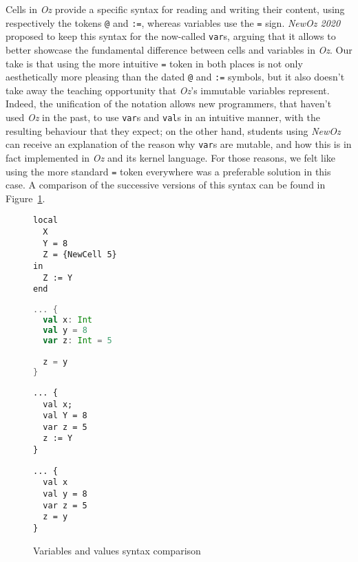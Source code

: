 Cells in \textit{Oz} provide a specific syntax for reading and writing their content, using respectively the tokens \texttt{@} and \texttt{:=}, whereas variables use the \texttt{=} sign.
\textit{NewOz 2020} proposed to keep this syntax for the now-called \texttt{var}s, arguing that it allows to better showcase the fundamental difference between cells and variables in \textit{Oz}.
Our take is that using the more intuitive \texttt{=} token in both places is not only aesthetically more pleasing than the dated \texttt{@} and \texttt{:=} symbols, but it also doesn't take away the teaching opportunity that \textit{Oz}'s immutable variables represent.
Indeed, the unification of the notation allows new programmers, that haven't used \textit{Oz} in the past, to use \texttt{var}s and \texttt{val}s in an intuitive manner, with the resulting behaviour that they expect;
on the other hand, students using \textit{NewOz} can receive an explanation of the reason why \texttt{var}s are mutable, and how this is in fact implemented in \textit{Oz} and its kernel language.
For those reasons, we felt like using the more standard \texttt{=} token everywhere was a preferable solution in this case.\newline
A comparison of the successive versions of this syntax can be found in Figure~\ref{fig:code-comp-var}.
\begin{figure}
    \noindent\begin{minipage}{.49\textwidth}
    \begin{lstlisting}[title={Oz},language=oz]
local
  X
  Y = 8
  Z = {NewCell 5}
in
  Z := Y
end
    \end{lstlisting}
\end{minipage}
\hfill
    \noindent\begin{minipage}{.49\textwidth}
    \begin{lstlisting}[title={Scala/Ozma},language=scala]
... {
  val x: Int
  val y = 8
  var z: Int = 5

  z = y
}
    \end{lstlisting}
\end{minipage}
    \noindent\begin{minipage}{.49\textwidth}
    \begin{lstlisting}[title={NewOz 2020},language=newoz]
... {
  val x;
  val Y = 8
  var z = 5
  z := Y
}
    \end{lstlisting}
\end{minipage}
\hfill
    \noindent\begin{minipage}{.49\textwidth}
    \begin{lstlisting}[title={NewOz 2021},language=newoz]
... {
  val x
  val y = 8
  var z = 5
  z = y
}
    \end{lstlisting}
\end{minipage}
\caption{Variables and values syntax comparison}
\label{fig:code-comp-var}
\end{figure}

